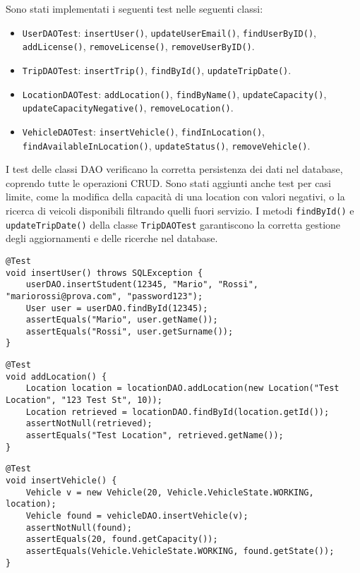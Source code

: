 Sono stati implementati i seguenti test nelle seguenti classi:
\begin{itemize}
    \item \texttt{UserDAOTest}: \texttt{insertUser()}, \texttt{updateUserEmail()}, \texttt{findUserByID()}, \texttt{addLicense()}, \texttt{removeLicense()}, \texttt{removeUserByID()}.
    \item \texttt{TripDAOTest}: \texttt{insertTrip()}, \texttt{findById()}, \texttt{updateTripDate()}.
    \item \texttt{LocationDAOTest}: \texttt{addLocation()}, \texttt{findByName()}, \texttt{updateCapacity()}, \texttt{updateCapacityNegative()}, \texttt{removeLocation()}.
    \item \texttt{VehicleDAOTest}: \texttt{insertVehicle()}, \texttt{findInLocation()}, \texttt{findAvailableInLocation()}, \texttt{updateStatus()}, \texttt{removeVehicle()}.
\end{itemize}

\noindent I test delle classi DAO verificano la corretta persistenza dei dati nel database, coprendo tutte le operazioni CRUD. Sono stati aggiunti anche test per casi limite, come la modifica della capacità di una location con valori negativi, o la ricerca di veicoli disponibili filtrando quelli fuori servizio. I metodi \texttt{findById()} e \texttt{updateTripDate()} della classe \texttt{TripDAOTest} garantiscono la corretta gestione degli aggiornamenti e delle ricerche nel database.

\begin{lstlisting}[style=java, caption={Inserimento di un utente in UserDAOTest}]
@Test
void insertUser() throws SQLException {
    userDAO.insertStudent(12345, "Mario", "Rossi", "mariorossi@prova.com", "password123");
    User user = userDAO.findById(12345);
    assertEquals("Mario", user.getName());
    assertEquals("Rossi", user.getSurname());
}
\end{lstlisting}

\begin{lstlisting}[style=java, caption={Aggiunta di una location in LocationDAOTest}]
@Test
void addLocation() {
    Location location = locationDAO.addLocation(new Location("Test Location", "123 Test St", 10));
    Location retrieved = locationDAO.findById(location.getId());
    assertNotNull(retrieved);
    assertEquals("Test Location", retrieved.getName());
}
\end{lstlisting}

\begin{lstlisting}[style=java, caption={Inserimento di un veicolo in VehicleDAOTest}]
@Test
void insertVehicle() {
    Vehicle v = new Vehicle(20, Vehicle.VehicleState.WORKING, location);
    Vehicle found = vehicleDAO.insertVehicle(v);
    assertNotNull(found);
    assertEquals(20, found.getCapacity());
    assertEquals(Vehicle.VehicleState.WORKING, found.getState());
}
\end{lstlisting}